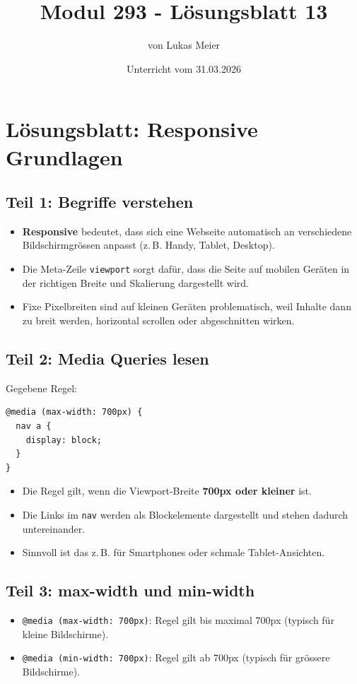 \documentclass[a4paper,12pt]{article}
\title{Modul 293 - L\"osungsblatt 13}
\author{von Lukas Meier}
\date{Unterricht vom 31.03.2026}
\begin{document}
\maketitle

\section*{L\"osungsblatt: Responsive Grundlagen}

\subsection*{Teil 1: Begriffe verstehen}
\begin{itemize}
  \item \textbf{Responsive} bedeutet, dass sich eine Webseite automatisch an verschiedene Bildschirmgr\"ossen anpasst (z.\,B. Handy, Tablet, Desktop).
  \item Die Meta-Zeile \texttt{viewport} sorgt daf\"ur, dass die Seite auf mobilen Ger\"aten in der richtigen Breite und Skalierung dargestellt wird.
  \item Fixe Pixelbreiten sind auf kleinen Ger\"aten problematisch, weil Inhalte dann zu breit werden, horizontal scrollen oder abgeschnitten wirken.
\end{itemize}

\subsection*{Teil 2: Media Queries lesen}
Gegebene Regel:
\begin{verbatim}
@media (max-width: 700px) {
  nav a {
    display: block;
  }
}
\end{verbatim}

\begin{itemize}
  \item Die Regel gilt, wenn die Viewport-Breite \textbf{700px oder kleiner} ist.
  \item Die Links im \texttt{nav} werden als Blockelemente dargestellt und stehen dadurch untereinander.
  \item Sinnvoll ist das z.\,B. f\"ur Smartphones oder schmale Tablet-Ansichten.
\end{itemize}

\subsection*{Teil 3: max-width und min-width}
\begin{itemize}
  \item \texttt{@media (max-width: 700px)}: Regel gilt bis maximal 700px (typisch f\"ur kleine Bildschirme).
  \item \texttt{@media (min-width: 700px)}: Regel gilt ab 700px (typisch f\"ur gr\"ossere Bildschirme).
\end{itemize}
\end{document}
